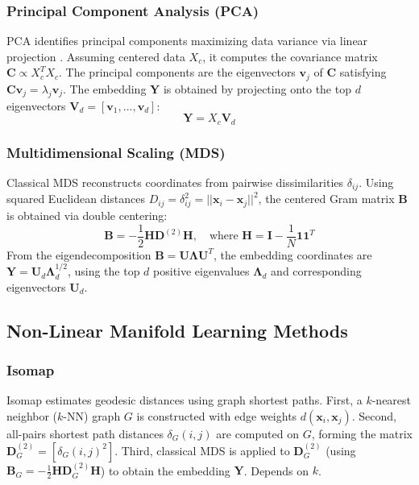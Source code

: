 \documentclass{article}
\begin{document}
\subsubsection{Principal Component Analysis (PCA)}
PCA identifies principal components maximizing data variance via linear projection \citep{Hotelling1933}. Assuming centered data $X_c$, it computes the covariance matrix $\mathbf{C} \propto X_c^T X_c$. The principal components are the eigenvectors $\mathbf{v}_j$ of $\mathbf{C}$ satisfying $\mathbf{C}\mathbf{v}_j = \lambda_j \mathbf{v}_j$. The embedding $\mathbf{Y}$ is obtained by projecting onto the top $d$ eigenvectors $\mathbf{V}_d = [\mathbf{v}_1, ..., \mathbf{v}_d]$:
\[ \mathbf{Y} = X_c \mathbf{V}_d \]

\subsubsection{Multidimensional Scaling (MDS)}
Classical MDS \citep{Young1941_MDS} reconstructs coordinates from pairwise dissimilarities $\delta_{ij}$. Using squared Euclidean distances $D_{ij} = \delta_{ij}^2 = ||\mathbf{x}_i - \mathbf{x}_j||^2$, the centered Gram matrix $\mathbf{B}$ is obtained via double centering:
\[ \mathbf{B} = -\frac{1}{2}\mathbf{H}\mathbf{D}^{(2)}\mathbf{H}, \quad \text{where } \mathbf{H} = \mathbf{I} - \frac{1}{N}\mathbf{1}\mathbf{1}^T \]
From the eigendecomposition $\mathbf{B} = \mathbf{U}\mathbf{\Lambda}\mathbf{U}^T$, the embedding coordinates are $\mathbf{Y} = \mathbf{U}_d \mathbf{\Lambda}_d^{1/2}$, using the top $d$ positive eigenvalues $\mathbf{\Lambda}_d$ and corresponding eigenvectors $\mathbf{U}_d$.

\subsection{Non-Linear Manifold Learning Methods}

\subsubsection{Isomap}
Isomap \citep{Tenenbaum2000} estimates geodesic distances using graph shortest paths. First, a $k$-nearest neighbor ($k$-NN) graph $G$ is constructed with edge weights $d(\mathbf{x}_i, \mathbf{x}_j)$. Second, all-pairs shortest path distances $\delta_{G}(i, j)$ are computed on $G$, forming the matrix $\mathbf{D}_G^{(2)} = [\delta_{G}(i, j)^2]$. Third, classical MDS is applied to $\mathbf{D}_G^{(2)}$ (using $\mathbf{B}_G = -\frac{1}{2}\mathbf{H}\mathbf{D}_G^{(2)}\mathbf{H}$) to obtain the embedding $\mathbf{Y}$. Depends on $k$.
\end{document}
